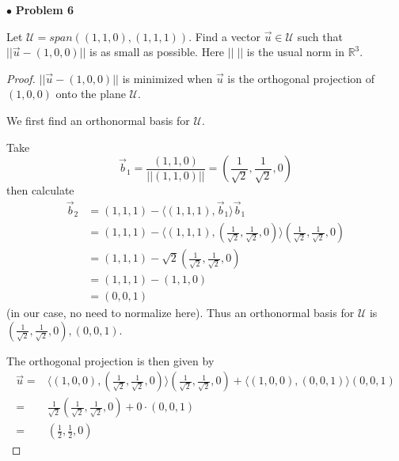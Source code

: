 \documentclass{article}
\begin{document}
\newpage
$ \bullet$ \textbf{Problem 6}
\medskip

\begin{itshape}
Let $\mathcal{U} = span((1,1,0), (1,1,1))$. Find a vector $\vec{u} \in \mathcal{U}$ such that $|| \vec{u} - (1,0,0)|| $ is as small as possible. Here $|| \; ||$ is the usual norm in $\mathbb{R}^3$.
\end{itshape}
\medskip

\begin{proof}
$|| \vec{u} - (1,0,0)|| $ is minimized when $\vec{u}$ is the orthogonal projection of $(1,0,0)$ onto the plane $\mathcal{U}$. 

We first find an orthonormal basis for $\mathcal{U}$. 

Take $$\vec{b}_1 = \frac{(1,1,0)}{||(1,1,0)||} = (\frac{1}{\sqrt{2}}, \frac{1}{\sqrt{2}}, 0) $$ then calculate 
\begin{align*}
\vec{b}_2 &= (1,1,1) - \langle (1,1,1) , \vec{b}_1 \rangle \vec{b}_1\\
&= (1,1,1) -  \langle (1,1,1) , (\frac{1}{\sqrt{2}}, \frac{1}{\sqrt{2}}, 0) \rangle (\frac{1}{\sqrt{2}}, \frac{1}{\sqrt{2}}, 0) \\
&= (1,1,1) - \sqrt{2}(\frac{1}{\sqrt{2}}, \frac{1}{\sqrt{2}}, 0) \\
&= (1,1,1) - (1,1,0) \\
&= (0,0,1)
\end{align*}
(in our case, no need to normalize here). Thus an orthonormal basis for $\mathcal{U}$ is $(\frac{1}{\sqrt{2}}, \frac{1}{\sqrt{2}}, 0) , (0,0,1)$.

The orthogonal projection is then given by 
\begin{align*} 
\vec{u} =&\langle (1,0,0), (\frac{1}{\sqrt{2}}, \frac{1}{\sqrt{2}}, 0)  \rangle (\frac{1}{\sqrt{2}}, \frac{1}{\sqrt{2}}, 0)  + \langle (1,0,0), (0,0,1) \rangle (0,0,1) \\
= &\frac{1}{\sqrt{2}} (\frac{1}{\sqrt{2}}, \frac{1}{\sqrt{2}}, 0)  + 0 \cdot (0,0,1) \\
=& (\frac{1}{2},\frac{1}{2},0)
\end{align*}
\end{proof}
\end{document}
